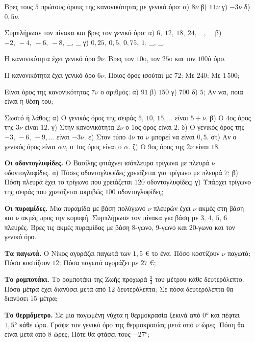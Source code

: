 \ex Βρες τους $5$ πρώτους όρους της κανονικότητας με γενικό όρο: α) $8\nu$ \quad β) $11\nu$ \quad γ) $-3\nu$ \quad δ) $0{,}5\nu$.

\ex Συμπλήρωσε τον πίνακα και βρες τον γενικό όρο: α) $6,\ 12,\ 18,\ 24,\ \_\_,\ \_\_$ \quad β) $-2,\ -4,\ -6,\ -8,\ \_\_,\ \_\_$ \quad γ) $0{,}25,\ 0{,}5,\ 0{,}75,\ 1,\ \_\_,\ \_\_$.

\ex Η κανονικότητα έχει γενικό όρο $9\nu$. Βρες τον $10$ο, τον $25$ο και τον $100$ό όρο.

\ex Η κανονικότητα έχει γενικό όρο $6\nu$. Ποιος όρος ισούται με $72$; Με $240$; Με $1\,500$;

\ex Είναι όρος της κανονικότητας $7\nu$ ο αριθμός: α) $91$ \quad β) $150$ \quad γ) $700$ \quad δ) $5$; Αν ναι, ποια είναι η θέση του;

\ex Σωστό ή λάθος; α) Ο γενικός όρος της σειράς $5,\,10,\,15,\dots$ είναι $5+\nu$. \quad β) Ο $4$ος όρος της $3\nu$ είναι $12$. \quad γ) Στην κανονικότητα $2\nu$ ο $1$ος όρος είναι $2$. \quad δ) Ο γενικός όρος της $-3,\,-6,\,-9,\dots$ είναι $-3\nu$. \quad ε) Στον τύπο $4\nu$ το $\nu$ μπορεί να είναι $0{,}5$. \quad στ) Αν ο γενικός όρος είναι $\alpha\nu$, ο $1$ος όρος είναι ο $\alpha$. \quad ζ) Ο $9$ος όρος της $2\nu$ είναι $18$.


\ex \textbf{Οι οδοντογλυφίδες.} Ο Βασίλης φτιάχνει ισόπλευρα τρίγωνα με πλευρά $\nu$ οδοντογλυφίδες. α) Πόσες οδοντογλυφίδες χρειάζεται για τρίγωνο με πλευρά $7$; β) Πόση πλευρά έχει το τρίγωνο που χρειάζεται $120$ οδοντογλυφίδες; γ) Υπάρχει τρίγωνο της σειράς που χρειάζεται ακριβώς $100$ οδοντογλυφίδες;

\ex \textbf{Οι πυραμίδες.} Μια πυραμίδα με βάση πολύγωνο $\nu$ πλευρών έχει $\nu$ ακμές στη βάση και $\nu$ ακμές προς την κορυφή. Συμπλήρωσε τον πίνακα για βάση με $3,\,4,\,5,\,6$ πλευρές. Βρες τις ακμές πυραμίδας με βάση $8$-γωνο, $9$-γωνο και $20$-γωνο και τον γενικό όρο.

\ex \textbf{Τα παγωτά.} Ο Νίκος αγοράζει παγωτά των $1{,}5$ € το ένα. Πόσο κοστίζουν $\nu$ παγωτά; Πόσο κοστίζουν $12$; Πόσα παγωτά αγοράζει με $27$ €;

\ex \textbf{Το ρομποτάκι.} Το ρομποτάκι της Ζωής προχωρά $\frac{3}{4}$ του μέτρου κάθε δευτερόλεπτο. Πόσα μέτρα έχει διανύσει μετά από $12$ δευτερόλεπτα; Σε πόσα δευτερόλεπτα θα διανύσει $15$ μέτρα;

\ex \textbf{Το θερμόμετρο.} Σε μια παγωμένη νύχτα η θερμοκρασία ξεκινά από $0$° και πέφτει $1{,}5$° κάθε ώρα. Γράψε τον γενικό όρο της θερμοκρασίας μετά από $\nu$ ώρες. Πόση θα είναι μετά από $8$ ώρες; Πότε θα φτάσει τους $-27$°;


